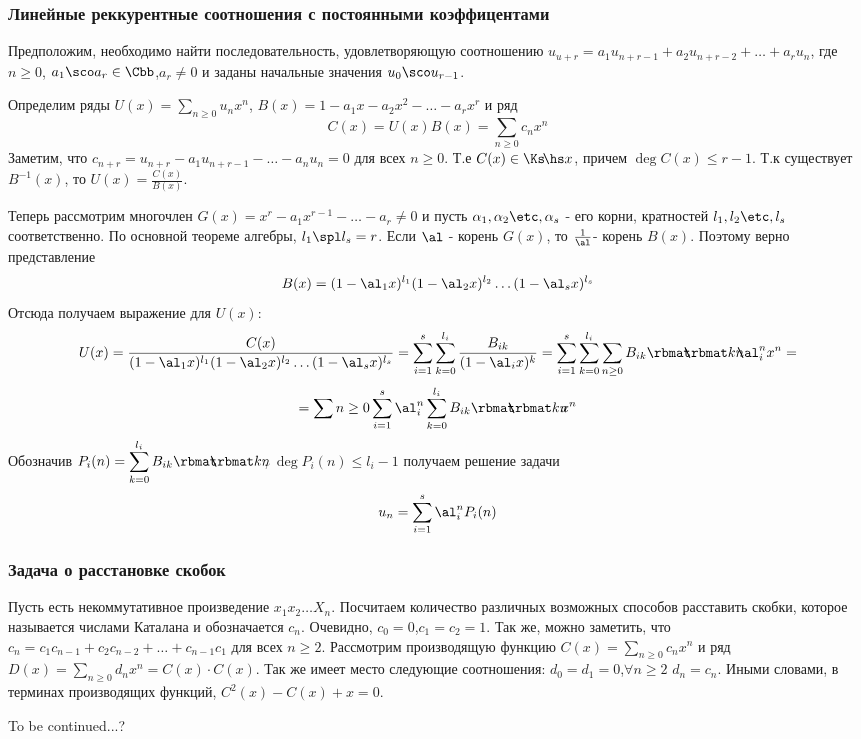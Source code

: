 \documentclass[unicode, 10pt, a4paper, oneside, fleqn]{article}
\begin{document}
\subsubsection{Линейные реккурентные соотношения с постоянными коэффицентами}
Предположим, необходимо найти последовательность, удовлетворяющую соотношению
$u_{u+r}=a_1u_{n+r-1}+a_2u_{n+r-2}+\dots+a_ru_n$, где $n\ge 0$, $a_1\sco a_r\in\Cbb$,$a_r\neq 0$ 
и заданы начальные значения $u_0\sco u_{r-1}$. 

Определим ряды $\displaystyle U(x)=\sum_{n\ge0}u_nx^n$, $B(x)=1-a_1x-a_2x^2-\dots-a_rx^r$ и ряд 
\begin{displaymath}
  \displaystyle C(x)=U(x)B(x)=\sum_{n\ge0}c_nx^n
\end{displaymath}
Заметим, что $c_{n+r}=u_{n+r}-a_1u_{n+r-1}-\dots-a_nu_n=0$ для всех $n\ge0$. Т.е $C(x)\in\Ksm$, причем 
$\deg C(x)\le r-1$. Т.к существует $B^{-1}(x)$, то $U(x)=\frac{C(x)}{B(x)}$.

Теперь рассмотрим многочлен $G(x)=x^r-a_1x^{r-1}-\dots-a_r\neq0$ и пусть 
$\set{s}$ - его корни, кратностей $\set[l]{s}$ соответственно. По основной теореме алгебры, $l_1\spl l_s=r$. Если 
$\al$  - корень $G(x)$, то $\inv{\al}$- корень $B(x)$. Поэтому верно представление
\begin{displaymath}
  B(x)=(1-\al_1x)^{l_1}(1-\al_2x)^{l_2}\dots(1-\al_sx)^{l_s}
\end{displaymath}
Отсюда получаем выражение для $U(x)$:
\begin{displaymath}
  U(x)=\frac{C(x)}{(1-\al_1x)^{l_1}(1-\al_2x)^{l_2}\dots(1-\al_sx)^{l_s}}=\sum_{i=1}^s\sum_{k=0}^{l_i}\frac{B_{ik}}{(1-\al_ix)^k}=\sumind{i}{1}{s}\sumind{k}{0}{l_i}\sum_{n\ge0}B_{ik}\cnka{k}{n}\al_i^nx^n=
\end{displaymath}
\begin{displaymath}
  =\sum{n\ge0}\sumind{i}{1}{s}\al_i^n\sumind{k}{0}{l_i}B_{ik}\cnka{k}{n}x^n
\end{displaymath}
Обозначив $\displaystyle P_i(n)=\sumind{k}{0}{l_i}B_{ik}\cnka{k}{n}$, $\deg P_i(n)\le l_i-1$ получаем решение 
задачи 
\begin{displaymath}
  \displaystyle u_n=\sumind{i}{1}{s}\al_i^nP_i(n)
\end{displaymath}
\subsubsection{Задача о расстановке скобок}
Пусть есть некоммутативное произведение $x_1x_2\dots X_n$. Посчитаем количество различных возможных
способов расставить скобки, которое называется числами Каталана и обозначается $c_n$. Очевидно,
$c_0=0$,$c_1=c_2=1$. Так же, можно заметить, что $c_n=c_1c_{n-1}+c_2c_{n-2}+\dots+c_{n-1}c_1$ для всех 
$n\ge2$.
Рассмотрим производящую функцию $\displaystyle C(x)=\sum_{n\ge0}c_nx^n$ и ряд 
$\displaystyle D(x)=\sum_{n\ge0}d_nx^n=C(x)\cdot C(x)$.
Так же имеет место следующие соотношения: $d_0=d_1=0$,$\forall n\ge2$ $d_n=c_n$. Иными словами, 
в терминах производящих функций, $C^2(x)-C(x)+x=0$.
\begin{authornote}
  To be continued...?
\end{authornote}
\end{document}
